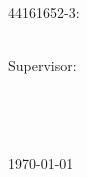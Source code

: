 \documentclass[11pt,
            english,
            twoside,
            liststotoc,
            singlespacing,
            headsepline,
            consistentlayout]{style}
\author{Lester James V. Miranda}
\theoremstyle{definition}
\begin{document}
\frontmatter

\pagestyle{plain}


\begin{titlepage}
\begin{center}
\vspace*{.02\textheight}
{\LARGE \bfseries \ttitle}\vspace{2.5cm} %

{\Large 44161652-3: \authorname} %
\vfill 

{\normalsize \degreename} \\[2.5cm] %

{\normalsize Supervisor: \supname} \\[2.5cm] %

{\normalsize \groupname} \\        %
{\normalsize \facname}   \\        %
{\normalsize \deptname}  \\[0.5cm] %

{\normalsize \univname} \\[0.5cm] %

{\normalsize \today} %
\end{center}
\end{titlepage}
\end{document}
